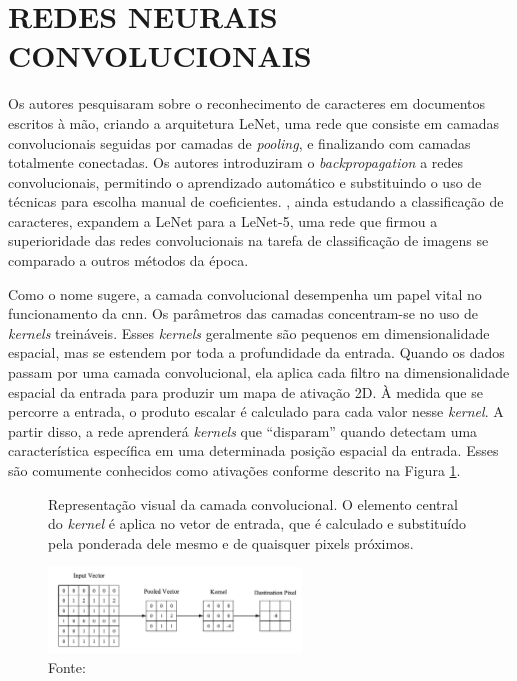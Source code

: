 \section{REDES NEURAIS CONVOLUCIONAIS}
\label{sec:cnn}


Os autores  pesquisaram sobre o reconhecimento de caracteres em documentos escritos à mão, criando a arquitetura LeNet, uma rede que consiste em camadas convolucionais seguidas por camadas de \textit{pooling}, e finalizando com camadas totalmente conectadas. Os autores introduziram o \textit{backpropagation} a redes convolucionais, permitindo o aprendizado automático e substituindo o uso de técnicas para escolha manual de coeficientes. , ainda estudando a classificação de caracteres, expandem a LeNet para a LeNet-5, uma rede que firmou a superioridade das redes convolucionais na tarefa de classificação de imagens se comparado a outros métodos da época.

Como o nome sugere, a camada convolucional desempenha um papel vital no funcionamento da \gls{cnn}. Os parâmetros das camadas concentram-se no uso de \textit{kernels} treináveis. Esses \textit{kernels} geralmente são pequenos em dimensionalidade espacial, mas se estendem por toda a profundidade da entrada. Quando os dados passam por uma camada convolucional, ela aplica cada filtro na dimensionalidade espacial da entrada para produzir um mapa de ativação 2D. À medida que se percorre a entrada, o produto escalar é calculado para cada valor nesse \textit{kernel}. A partir disso, a rede aprenderá \textit{kernels} que ``disparam'' quando detectam uma característica específica em uma determinada posição espacial da entrada. Esses são comumente conhecidos como ativações conforme descrito na Figura \ref{fig:fig024}.

\begin{figure}[h!]
    \centering
    \captionsetup{width=0.98\textwidth, justification=justified}
    \caption{Representação visual da camada convolucional. O elemento central do \textit{kernel} é aplica no vetor de entrada, que é calculado e substituído pela ponderada dele mesmo e de quaisquer pixels próximos.}
    \includegraphics[width=0.6\textwidth]{figures/fig024.png}
    \caption*{Fonte: \cite{osheaIntroductionConvolutionalNeural2015c}}
    \label{fig:fig024}
\end{figure}

